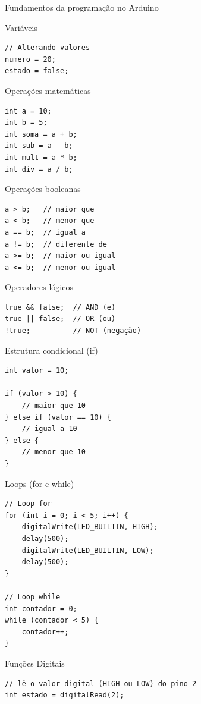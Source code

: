 \begin{frame}{Fundamentos da programação no Arduino}
\begin{block}{Variáveis}
\begin{verbatim}
// Alterando valores
numero = 20;
estado = false;
    \end{verbatim}
  \end{block}

  \begin{block}{Operações matemáticas}
    \begin{verbatim}
int a = 10;
int b = 5;
int soma = a + b;
int sub = a - b;
int mult = a * b;
int div = a / b;
    \end{verbatim}
  \end{block}

  \begin{block}{Operações booleanas}
    \begin{verbatim}
a > b;   // maior que
a < b;   // menor que
a == b;  // igual a
a != b;  // diferente de
a >= b;  // maior ou igual
a <= b;  // menor ou igual
    \end{verbatim}
  \end{block}

  \begin{block}{Operadores lógicos}
    \begin{verbatim}
true && false;  // AND (e)
true || false;  // OR (ou)
!true;          // NOT (negação)
    \end{verbatim}
  \end{block}

  \begin{block}{Estrutura condicional (if)}
    \begin{verbatim}
int valor = 10;

if (valor > 10) {
    // maior que 10
} else if (valor == 10) {
    // igual a 10
} else {
    // menor que 10
}
    \end{verbatim}
  \end{block}

  \begin{block}{Loops (for e while)}
    \begin{verbatim}
// Loop for
for (int i = 0; i < 5; i++) {
    digitalWrite(LED_BUILTIN, HIGH);
    delay(500);
    digitalWrite(LED_BUILTIN, LOW);
    delay(500);
}

// Loop while
int contador = 0;
while (contador < 5) {
    contador++;
}
    \end{verbatim}
  \end{block}

  \begin{block}{Funções Digitais}
    \begin{verbatim}
// lê o valor digital (HIGH ou LOW) do pino 2
int estado = digitalRead(2);


\end{verbatim}
\end{block}
\end{frame}
